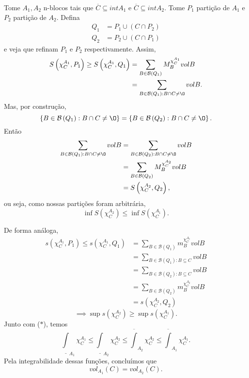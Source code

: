 \documentclass[a4paper]{report}
\begin{document}
Tome $A_1, A_2$ n-blocos tais que $\overline{C}\subseteq int A_1$ e $\overline{C}\subseteq int A_2$. Tome $P_1$ partição de $A_1$ e $P_2$ partição de $A_2$. Defina
\begin{align*}
    Q_1 &= P_1 \cup \left( C\cap P_2 \right) \\
    Q_2&= P_2 \cup \left( C\cap P_1 \right)
\end{align*}
e veja que refinam $P_1$ e $P_2$ respectivamente. Assim,
\begin{align*}
    S\left( \chi_C^{A_1}, P_1 \right) \ge S\left( \chi_C^{A_1}, Q_1 \right) &= \sum_{B\in \mathcal{B}\left( Q_1 \right) } M_B^{\chi_C^{A_1}} vol B \\
    &= \sum_{B\in \mathcal{B}\left( Q_1 \right) : B\cap C \neq \O} vol B
.\end{align*}
Mas, por construção, \[
\left\{ B\in \mathcal{B}\left( Q_1 \right) : B\cap C\neq \O \right\} = \left\{ B\in \mathcal{B}\left( Q_2 \right) : B\cap C \neq \O \right\} 
.\] Então
\begin{align*}
    \sum_{B\in \mathcal{B}\left( Q_1 \right) : B\cap C \neq \O} vol B &= \sum_{B\in \mathcal{B}\left( Q_2 \right) : B\cap C \neq \O} vol B \\
    &= \sum_{B\in \mathcal{B}\left( Q_2 \right) } M_B^{\chi_C^{A_2}} vol B \\
    &= S\left( \chi_C^{A_2}, Q_2 \right) 
,\end{align*}
ou seja, como nossas partições foram arbitrária, \[
\inf S\left( \chi_C^{A_2} \right) \le \inf S\left( \chi_C^{A_1} \right)  \tag{$*$}
.\] 

De forma análoga,
\begin{align*}
    s\left( \chi_C^{A_1}, P_1 \right) \le  s\left( \chi_C^{A_1}, Q_1 \right) &= \sum_{B\in \mathcal{B}\left( Q_1 \right) } m_B^{\chi_C^{A_1}} vol B \\
    &= \sum_{B\in \mathcal{B}\left( Q_1 \right) : B \subseteq C} vol B \\
    &= \sum_{B\in \mathcal{B}\left( Q_2 \right) : B \subseteq C} vol B \\
    &= \sum_{B\in \mathcal{B}\left( Q_2 \right) } m_B^{\chi_C^{A_2}} vol B \\
    &= s\left( \chi_C^{A_2}, Q_2 \right) 
\end{align*}
\[
\implies \sup s\left( \chi_C^{A_2} \right) \ge \sup s\left( \chi_C^{A_1} \right) 
.\] Junto com ($*$), temos \[
\underline{\int}_{A_1}\chi_C^{A_1} \le \underline{\int}_{A_2}\chi_C^{A_2} \le \overline{\int}_{A_2}\chi_C^{A_2}\le \overline{\int}_{A_1}\chi_C^{A_1}
.\] Pela integrabilidade dessas funções, concluímos que \[
vol_{A_1}\left( C \right) = vol_{A_2}\left( C \right) 
.\] 
\end{document}
